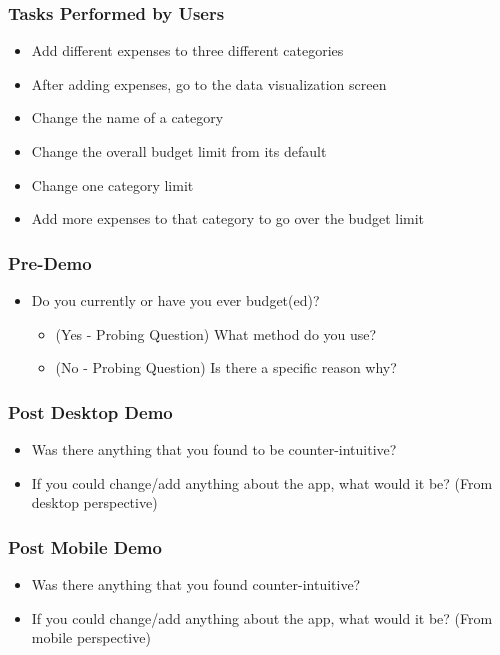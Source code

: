 \documentclass{chi2011}
\begin{document}
	\subsubsection{Tasks Performed by Users}
	\begin{itemize}[noitemsep]
		\item Add different expenses to three different categories
		\item After adding expenses, go to the data visualization screen
		\item Change the name of a category
		\item Change the overall budget limit from its default
		\item Change one category limit
		\item Add more expenses to that category to go over the budget limit
	\end{itemize}
		
	\subsubsection{Pre-Demo}
	\begin{itemize}[noitemsep]
		\item Do you currently or have you ever budget(ed)?
		\begin{itemize}[noitemsep]
			\item (Yes - Probing Question) What method do you use?
			\item (No - Probing Question) Is there a specific reason why?
		\end{itemize}
	\end{itemize}
	
	\subsubsection{Post Desktop Demo}
	\begin{itemize}[noitemsep]
		\item Was there anything that you found to be counter-intuitive?
		\item If you could change/add anything about the app, what would it be? (From desktop perspective)
	\end{itemize}

	\subsubsection{Post Mobile Demo}
	\begin{itemize}[noitemsep]
		\item Was there anything that you found counter-intuitive?
		\item If you could change/add anything about the app, what would it be? (From mobile perspective)
	\end{itemize}
\end{document}
